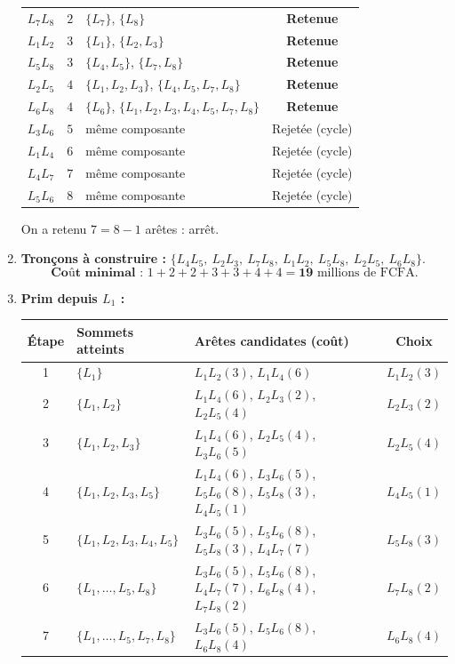 \documentclass[11pt]{article}
\begin{document}
\begin{corrige}
\begin{enumerate}
\begin{center}
\begin{tabular}{|c|c|l|c|}
$L_7L_8$ & $2$ & $\{L_7\}$, $\{L_8\}$ & \textbf{Retenue} \\
$L_1L_2$ & $3$ & $\{L_1\}$, $\{L_2, L_3\}$ & \textbf{Retenue} \\
$L_5L_8$ & $3$ & $\{L_4, L_5\}$, $\{L_7, L_8\}$ & \textbf{Retenue} \\
$L_2L_5$ & $4$ & $\{L_1, L_2, L_3\}$, $\{L_4, L_5, L_7, L_8\}$ & \textbf{Retenue} \\
$L_6L_8$ & $4$ & $\{L_6\}$, $\{L_1, L_2, L_3, L_4, L_5, L_7, L_8\}$ & \textbf{Retenue} \\
$L_3L_6$ & $5$ & même composante & Rejetée (cycle) \\
$L_1L_4$ & $6$ & même composante & Rejetée (cycle) \\
$L_4L_7$ & $7$ & même composante & Rejetée (cycle) \\
$L_5L_6$ & $8$ & même composante & Rejetée (cycle) \\
\hline
\end{tabular}
\end{center}
On a retenu $7 = 8 - 1$ arêtes : arrêt.
\item \textbf{Tronçons à construire :} $\{L_4L_5,\ L_2L_3,\ L_7L_8,\ L_1L_2,\ L_5L_8,\ L_2L_5,\ L_6L_8\}$.
\[ \textbf{Coût minimal : } 1 + 2 + 2 + 3 + 3 + 4 + 4 = \mathbf{19} \text{ millions de FCFA.} \]
\item \textbf{Prim depuis $L_1$ :}
\begin{center}
\begin{tabular}{|c|l|l|c|}
\hline
\rowcolor{popblueL} Étape & Sommets atteints & Arêtes candidates (coût) & Choix \\
\hline
1 & $\{L_1\}$ & $L_1L_2(3)$, $L_1L_4(6)$ & $L_1L_2(3)$ \\
2 & $\{L_1, L_2\}$ & $L_1L_4(6)$, $L_2L_3(2)$, $L_2L_5(4)$ & $L_2L_3(2)$ \\
3 & $\{L_1, L_2, L_3\}$ & $L_1L_4(6)$, $L_2L_5(4)$, $L_3L_6(5)$ & $L_2L_5(4)$ \\
4 & $\{L_1, L_2, L_3, L_5\}$ & $L_1L_4(6)$, $L_3L_6(5)$, $L_5L_6(8)$, $L_5L_8(3)$, $L_4L_5(1)$ & $L_4L_5(1)$ \\
5 & $\{L_1, L_2, L_3, L_4, L_5\}$ & $L_3L_6(5)$, $L_5L_6(8)$, $L_5L_8(3)$, $L_4L_7(7)$ & $L_5L_8(3)$ \\
6 & $\{L_1, \dots, L_5, L_8\}$ & $L_3L_6(5)$, $L_5L_6(8)$, $L_4L_7(7)$, $L_6L_8(4)$, $L_7L_8(2)$ & $L_7L_8(2)$ \\
7 & $\{L_1, \dots, L_5, L_7, L_8\}$ & $L_3L_6(5)$, $L_5L_6(8)$, $L_6L_8(4)$ & $L_6L_8(4)$ \\
\hline

\end{tabular}
\end{center}
\end{enumerate}
\end{corrige}
\end{document}
